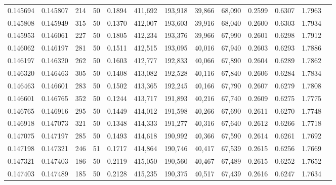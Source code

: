\begin{tabular}{rrrrrrrrrrrrr}
0.145694 & 0.145807 &   214 &  50 &                                     0.1894 & 411,692 & 193,918 &  39,866 &  68,090 & 0.2599 & 0.6307 & 1.7963 \\
0.145808 & 0.145949 &   315 &  50 &                                     0.1370 & 412,007 & 193,603 &  39,916 &  68,040 & 0.2600 & 0.6303 & 1.7934 \\
0.145953 & 0.146061 &   227 &  50 &                                     0.1805 & 412,234 & 193,376 &  39,966 &  67,990 & 0.2601 & 0.6298 & 1.7912 \\
0.146062 & 0.146197 &   281 &  50 &                                     0.1511 & 412,515 & 193,095 &  40,016 &  67,940 & 0.2603 & 0.6293 & 1.7886 \\
0.146197 & 0.146320 &   262 &  50 &                                     0.1603 & 412,777 & 192,833 &  40,066 &  67,890 & 0.2604 & 0.6289 & 1.7862 \\
0.146320 & 0.146463 &   305 &  50 &                                     0.1408 & 413,082 & 192,528 &  40,116 &  67,840 & 0.2606 & 0.6284 & 1.7834 \\
0.146463 & 0.146601 &   283 &  50 &                                     0.1502 & 413,365 & 192,245 &  40,166 &  67,790 & 0.2607 & 0.6279 & 1.7808 \\
0.146601 & 0.146765 &   352 &  50 &                                     0.1244 & 413,717 & 191,893 &  40,216 &  67,740 & 0.2609 & 0.6275 & 1.7775 \\
0.146765 & 0.146916 &   295 &  50 &                                     0.1449 & 414,012 & 191,598 &  40,266 &  67,690 & 0.2611 & 0.6270 & 1.7748 \\
0.146918 & 0.147073 &   321 &  50 &                                     0.1348 & 414,333 & 191,277 &  40,316 &  67,640 & 0.2612 & 0.6266 & 1.7718 \\
0.147075 & 0.147197 &   285 &  50 &                                     0.1493 & 414,618 & 190,992 &  40,366 &  67,590 & 0.2614 & 0.6261 & 1.7692 \\
0.147198 & 0.147321 &   246 &  51 &                                     0.1717 & 414,864 & 190,746 &  40,417 &  67,539 & 0.2615 & 0.6256 & 1.7669 \\
0.147321 & 0.147403 &   186 &  50 &                                     0.2119 & 415,050 & 190,560 &  40,467 &  67,489 & 0.2615 & 0.6252 & 1.7652 \\
0.147403 & 0.147489 &   185 &  50 &                                     0.2128 & 415,235 & 190,375 &  40,517 &  67,439 & 0.2616 & 0.6247 & 1.7634 \\

\end{tabular}
